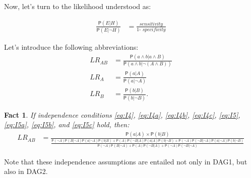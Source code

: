 \documentclass[
  10pt,
  dvipsnames,enabledeprecatedfontcommands]{scrartcl}
\newtheorem{fact}{Fact}
\newcommand{\n}{\neg}
\newcommand{\pr}[1]{\ensuremath{\mathsf{P}(#1)}}
\begin{document}
Now, let's turn to the likelihood understood as:

\begin{align*}
\frac{\pr{E \vert H}}{\pr{E \vert \neg H}} & =
\frac{\textit{sensitivity}}{\textit{1- specificity}}\end{align*}

\noindent Let's introduce the following abbreviations: \begin{align*}
LR_{AB} &= \frac{\pr{a\wedge b \vert a\wedge B}}{\pr{a \wedge b \vert \neg (A\wedge B)}}\\
LR_A & = \frac{\pr{a \vert A}}{\pr{a \vert \n A}} \\
LR_B & = \frac{\pr{b \vert B}}{\pr{b \vert \n B}}.
\end{align*}

\begin{fact} If independence conditions  \eqref{eq:I4}, \eqref{eq:I4a}, \eqref{eq:I4b},   \eqref{eq:I4c},  \eqref{eq:I5},   \eqref{eq:I5a},    \eqref{eq:I5b}, and   \eqref{eq:I5c}    hold, then:
\begin{align*}
LR_{AB} & =  \frac{\pr{a \vert A} \times \pr{b \vert B}}
 {\frac{\pr{\neg A}\pr{B \vert \neg A} \pr{a \vert \neg A}\pr{b \vert B} + \pr{A}\pr{\neg B \vert A} \pr{a \vert A }\pr{b \vert \neg B} + \pr{\neg A}\pr{\neg B \vert \neg A } \pr{a \vert \neg A}\pr{b \vert \neg B}}{\pr{\neg A}\pr{B \vert \neg A} + \pr{A}\pr{\neg B \vert A } + \pr{\neg A}\pr{\neg B \vert \neg A} }}
\end{align*}
\end{fact}

\noindent Note that these independence assumptions are entailed not only
in \textsf{DAG1}, but also in \textsf{DAG2}.
\end{document}
